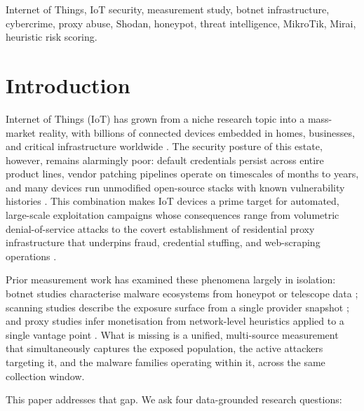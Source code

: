 \documentclass[journal]{IEEEtran}
\begin{document}
\begin{IEEEkeywords}
Internet of Things, IoT security, measurement study, botnet infrastructure,
cybercrime, proxy abuse, Shodan, honeypot, threat intelligence, MikroTik,
Mirai, heuristic risk scoring.
\end{IEEEkeywords}

\section{Introduction}
\label{sec:intro}

 Internet of Things (IoT) has grown from a niche research
topic into a mass-market reality, with billions of connected devices embedded
in homes, businesses, and critical infrastructure worldwide
\cite{alrawi2019sok}.
The security posture of this estate, however, remains alarmingly poor:
default credentials persist across entire product lines, vendor patching
pipelines operate on timescales of months to years, and many devices run
unmodified open-source stacks with known vulnerability histories
\cite{siwakoti2023advances, cetin2019cleaning}.
This combination makes IoT devices a prime target for automated, large-scale
exploitation campaigns whose consequences range from volumetric denial-of-service
attacks \cite{antonakakis2017, jonker2017millions} to the covert establishment of
residential proxy infrastructure that underpins fraud, credential stuffing, and
web-scraping operations \cite{chiapponi2023inside, mi2019resident}.

Prior measurement work has examined these phenomena largely in isolation:
botnet studies characterise malware ecosystems from honeypot or telescope data
\cite{hiesgen2024age, huang2020iot}; scanning studies describe the exposure
surface from a single provider snapshot \cite{durumeric2015search, luo2023iot};
and proxy studies infer monetisation from network-level heuristics applied to
a single vantage point \cite{xia2021characterizing}.
What is missing is a unified, multi-source measurement that simultaneously
captures the exposed population, the active attackers targeting it, and the
malware families operating within it, across the same collection window.

This paper addresses that gap.
We ask four data-grounded research questions:
\end{document}
